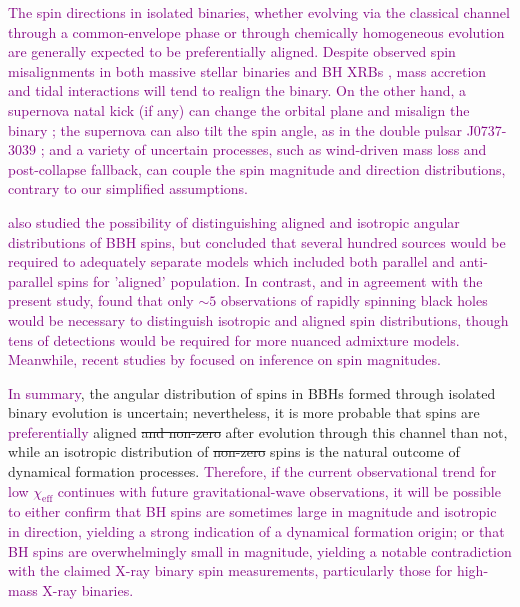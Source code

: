 \documentclass[modern,linenumbers]{aastex61}
\newcommand{\chieff}{\chi_\mathrm{eff}}
\newcommand{\ilya}[1]{\textcolor{purple}{#1}}
\begin{document}
\ilya{The spin directions in isolated binaries, whether evolving via the classical channel through a common-envelope phase \citep{TutukovYungelson:1973,TutukovYungelson:1993,Lipunov:1997,2016Natur.534..512B,Stevenson:2017} or through chemically homogeneous evolution \citep{MandeldeMink:2016,Marchant:2016} are generally expected to be preferentially aligned.  Despite  observed spin misalignments in both massive stellar binaries \citep{Albrecht:2009,2014ApJ...785...83A} and BH XRBs \citep{Orosz:2001,Martin:2008b,Martin:2008,MorningstarMiller:2014}, mass accretion and tidal interactions will tend to realign the binary.  On the other hand, a supernova natal kick (if any) can change the orbital plane and misalign the binary \citep{2000ApJ...541..319K,2013PhRvD..87j4028G}; the supernova can also tilt the spin angle, as in the double pulsar J0737-3039 \citep{2011ApJ...742...81F}; and a variety of uncertain processes, such as wind-driven mass loss and post-collapse fallback, can couple the spin magnitude and direction distributions, contrary to our simplified assumptions.}

\ilya{\citet{2017CQGra..34cLT01V} also studied the possibility of distinguishing aligned and isotropic angular distributions of \ac{BBH} spins, but concluded that several hundred sources would be required to adequately separate models which included both parallel and anti-parallel spins for 'aligned' population.  In contrast, and in agreement with the present study, \citet{Stevenson:2017spin} found that only $\sim 5$ observations of rapidly spinning black holes would be necessary to distinguish isotropic and aligned spin distributions, though tens of detections would be required for more nuanced admixture models.  Meanwhile, recent studies by \citet{Fishbach:2017,Gerosa:2017} focused on inference on spin magnitudes.}

\ilya{In summary}, the angular distribution of spins in \acp{BBH} formed through isolated binary evolution is uncertain; nevertheless, it is more probable that spins are \ilya{preferentially} aligned \sout{and non-zero} after evolution through this channel than not, while an isotropic distribution of \sout{non-zero} spins is the natural outcome of dynamical formation processes.  \ilya{Therefore, if the current observational trend for low $\chieff$ continues with future gravitational-wave observations, it will be possible to either confirm that \ac{BH} spins are sometimes large in magnitude and isotropic in direction, yielding a strong indication of a dynamical formation origin; or that \ac{BH} spins are overwhelmingly small in magnitude, yielding a notable contradiction with the claimed X-ray binary spin measurements, particularly those for high-mass X-ray binaries.}
\end{document}
